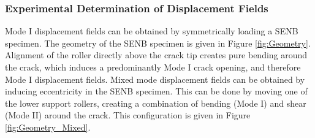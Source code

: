 \documentclass[12pt]{article}
\begin{document}
\subsubsection{Experimental Determination of Displacement Fields} %
Mode I displacement fields can be obtained by symmetrically loading a SENB specimen. The geometry of the SENB specimen is given in Figure \ref{fig:Geometry}. Alignment of the roller directly above the crack tip creates pure bending around the crack, which induces a predominantly Mode I crack opening, and therefore Mode I displacement fields. Mixed mode displacement fields can be obtained by inducing eccentricity in the SENB specimen. This can be done by moving one of the lower support rollers, creating a combination of bending (Mode I) and shear (Mode II) around the crack. This configuration is given in Figure \ref{fig:Geometry_Mixed}.  
\end{document}
